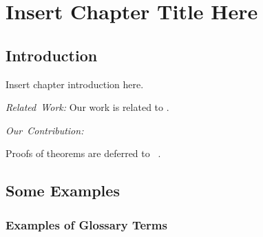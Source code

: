 \chapter{Insert Chapter Title Here}
\label{Section:ChapAbbr}



\section{Introduction}
\label{Section:ChapAbbr:Introduction}

Insert chapter introduction here.
\lipsum[1-2]

\mbox{\textit{Related Work:}}
Our work is related to \cite{Examples:Conference01, Examples:Journal01, Examples:Conference02, Examples:Journal02, Examples:Conference03}.
\lipsum[3-4]

\mbox{\textit{Our Contribution:}}
\lipsum[5-6]

Proofs of theorems are deferred to \Section~.


\section{Some Examples}
\label{Section:ChapAbbr:SomeExamples}

\lipsum[7]


\subsection{Examples of Glossary Terms}
\label{Section:ChapAbbr:SomeExamples:GlossaryTerms}


